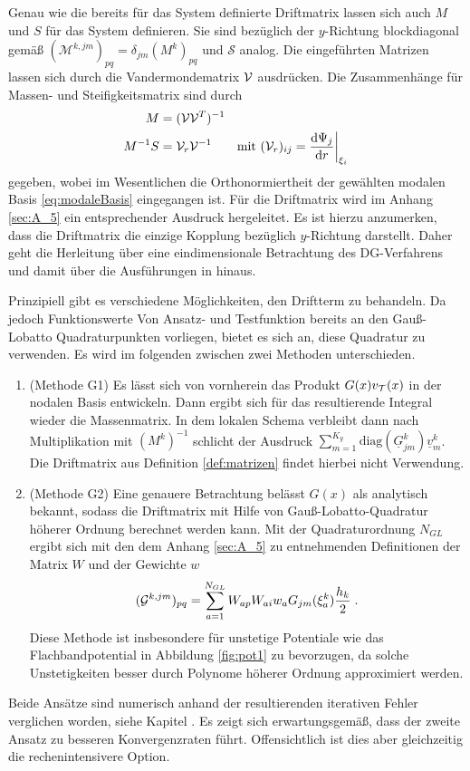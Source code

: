 Genau wie die bereits für das System definierte Driftmatrix lassen sich auch $M$ und $S$ für das System definieren. Sie sind bezüglich der $y$-Richtung blockdiagonal gemäß $(\mathcal{M}^{k,jm})_{pq} = \delta_{jm}(M^k)_{pq}$ und $\mathcal{S}$ analog.
Die eingeführten Matrizen lassen sich durch die Vandermondematrix $\mathcal{V}$ ausdrücken. Die Zusammenhänge für Massen- und Steifigkeitsmatrix sind durch
\begin{align*}
  M &= (\mathcal{V}\mathcal{V}^T)^{-1} \\
  M^{-1}S &= \mathcal{V}_r \mathcal{V}^{-1} \qquad \text{mit } (\mathcal{V}_r)_{ij} = \frac{\mathrm{d}\Psi_j}{\mathrm{d}r}\biggr\rvert_{\xi_i}
\end{align*}
gegeben, wobei im Wesentlichen die Orthonormiertheit der gewählten modalen Basis \eqref{eq:modaleBasis} eingegangen ist. Für die Driftmatrix wird im Anhang \ref{sec:A_5} ein entsprechender Ausdruck hergeleitet. Es ist hierzu anzumerken, dass die Driftmatrix die einzige Kopplung bezüglich $y$-Richtung darstellt. Daher geht die Herleitung über eine eindimensionale Betrachtung des DG-Verfahrens und damit über die Ausführungen in \cite{buch} hinaus.

Prinzipiell gibt es verschiedene Möglichkeiten, den Driftterm zu behandeln. Da jedoch Funktionswerte Von Ansatz- und Testfunktion bereits an den Gauß-Lobatto Quadraturpunkten vorliegen, bietet es sich an, diese Quadratur zu verwenden. Es wird im folgenden zwischen zwei Methoden unterschieden.
\begin{enumerate}
  \item (Methode G1) Es lässt sich von vornherein das Produkt $G(x)v_{\mathcal{T}}(x)$ in der nodalen Basis entwickeln. Dann ergibt sich für das resultierende Integral wieder die Massenmatrix. In dem lokalen Schema verbleibt dann nach Multiplikation mit $(M^k)^{-1}$ schlicht der Ausdruck ${\sum_{m=1}^{K_y}\text{diag}(\underline{G}^k_{jm})\underline{v}_m^k}$. Die Driftmatrix aus Definition \ref{def:matrizen} findet hierbei nicht Verwendung.
  \item (Methode G2) Eine genauere Betrachtung belässt $G(x)$ als analytisch bekannt, sodass die Driftmatrix mit Hilfe von Gauß-Lobatto-Quadratur höherer Ordnung berechnet werden kann. Mit der Quadraturordnung $N_{GL}$ ergibt sich mit den dem Anhang \ref{sec:A_5} zu entnehmenden Definitionen der Matrix $W$ und der Gewichte $w$
  \begin{equation}
    (\mathcal{G}^{k,jm})_{pq} = \sum_{a=1}^{N_{GL}} W_{ap} W_{ai} w_a G_{jm}(\xi_a^k)\frac{h_k}{2} \; .
    \label{eq:G_GL}
  \end{equation}
  Diese Methode ist insbesondere für unstetige Potentiale wie das Flachbandpotential in Abbildung \ref{fig:pot1} zu bevorzugen, da solche Unstetigkeiten besser durch Polynome höherer Ordnung approximiert werden.
\end{enumerate}
Beide Ansätze sind numerisch anhand der resultierenden iterativen Fehler verglichen worden, siehe Kapitel . Es zeigt sich erwartungsgemäß, dass der zweite Ansatz zu besseren Konvergenzraten führt. Offensichtlich ist dies aber gleichzeitig die rechenintensivere Option.

